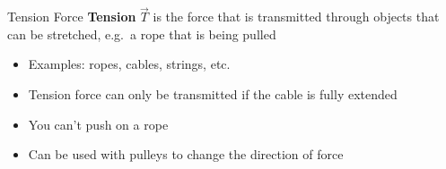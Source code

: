\documentclass[12pt,compress,aspectratio=169]{beamer}
\begin{document}
%
%



\begin{frame}{Tension Force}
  \textbf{Tension} $\vec T$ is the force that is transmitted through objects
  that can be stretched, e.g.\ a rope that is being pulled
  \begin{center}
  \end{center}
  \begin{itemize}
  \item Examples: ropes, cables, strings, etc.
  \item Tension force can only be transmitted if the cable is fully extended
  \item You can't push on a rope
  \item Can be used with pulleys to change the direction of force
  \end{itemize}
\end{frame}
\end{document}
